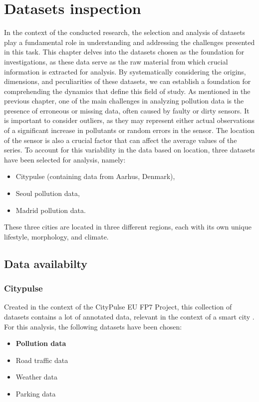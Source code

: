 \chapter{Datasets inspection}
\label{chap:Datasets}

In the context of the conducted research, the selection and analysis of datasets play a fundamental role in understanding and addressing the challenges presented in this task. This chapter delves into the datasets chosen as the foundation for investigations, as these data serve as the raw material from which crucial information is extracted for analysis. By systematically considering the origins, dimensions, and peculiarities of these datasets, we can establish a foundation for comprehending the dynamics that define this field of study.
As mentioned in the previous chapter, one of the main challenges in analyzing pollution data is the presence of erroneous or missing data, often caused by faulty or dirty sensors. 
It is important to consider outliers, as they may represent either actual observations of a significant increase in pollutants or random errors in the sensor. The location of the sensor is also a crucial factor that can affect the average values of the series. 
To account for this variability in the data based on location, three datasets have been selected for analysis, namely:
\begin{itemize}[noitemsep]
    \item Citypulse (containing data from Aarhus, Denmark),
    \item Seoul pollution data,
    \item Madrid pollution data.
\end{itemize}

These three cities are located in three different regions, each with its own unique lifestyle, morphology, and climate.

\section{Data availabilty}
\subsection{Citypulse}
Created in the context of the CityPulse EU FP7 Project, this collection of datasets contains a lot of annotated data, relevant in the context of a smart city \cite{CityPulseDataset}. For this analysis, the following datasets have been chosen:
\begin{itemize}[noitemsep]
    \item \textbf{Pollution data}
    \item Road traffic data
    \item Weather data
    \item Parking data
\end{itemize}

